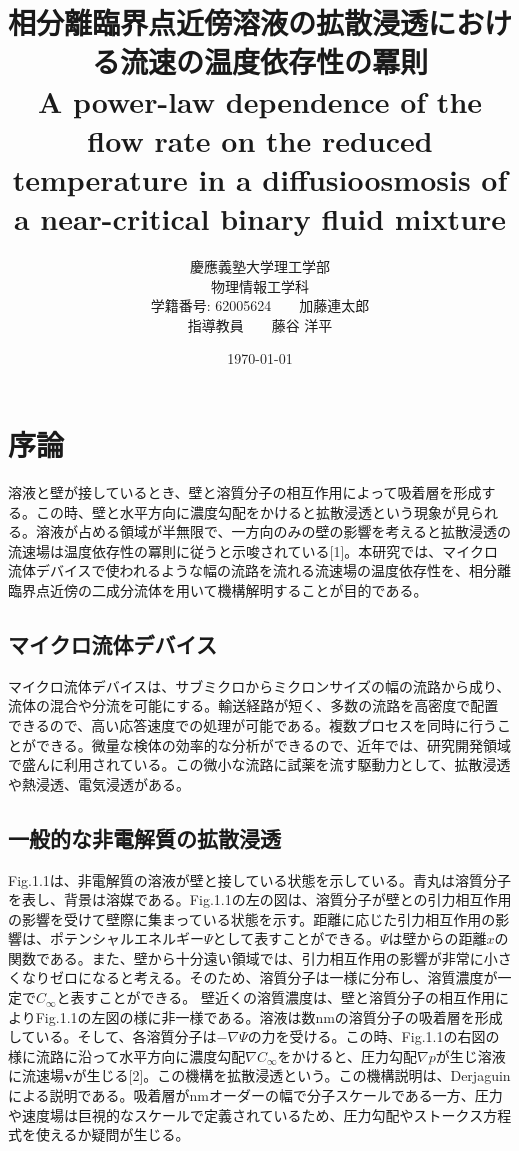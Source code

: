 \documentclass[a4paper,12pt, oneside, openany]{jsbook}
\title{相分離臨界点近傍溶液の拡散浸透における流速の温度依存性の冪則\\A power-law dependence of the flow rate on the reduced temperature in a diffusioosmosis of a near-critical binary fluid mixture }
\date{\today}
\author{慶應義塾大学理工学部\\
物理情報工学科\\
学籍番号: 62005624~~~~加藤連太郎\\
指導教員~~~~藤谷 洋平}
\begin{document}
\maketitle
\thispagestyle{empty}
\mbox{}\newpage
\newpage
\setcounter{tocdepth}{2}
\tableofcontents

\newpage
{}
\setcounter{page}{1}


\newpage
\chapter{序論}
溶液と壁が接しているとき、壁と溶質分子の相互作用によって吸着層を形成する。この時、壁と水平方向に濃度勾配をかけると拡散浸透という現象が見られる。溶液が占める領域が半無限で、一方向のみの壁の影響を考えると拡散浸透の流速場は温度依存性の冪則に従うと示唆されている[1]。本研究では、マイクロ流体デバイスで使われるような幅の流路を流れる流速場の温度依存性を、相分離臨界点近傍の二成分流体を用いて機構解明することが目的である。

\section{マイクロ流体デバイス}
マイクロ流体デバイスは、サブミクロからミクロンサイズの幅の流路から成り、流体の混合や分流を可能にする。輸送経路が短く、多数の流路を高密度で配置できるので、高い応答速度での処理が可能である。複数プロセスを同時に行うことができる。微量な検体の効率的な分析ができるので、近年では、研究開発領域で盛んに利用されている。この微小な流路に試薬を流す駆動力として、拡散浸透や熱浸透、電気浸透がある。




\section{一般的な非電解質の拡散浸透}
Fig.1.1は、非電解質の溶液が壁と接している状態を示している。青丸は溶質分子を表し、背景は溶媒である。Fig.1.1の左の図は、溶質分子が壁との引力相互作用の影響を受けて壁際に集まっている状態を示す。距離に応じた引力相互作用の影響は、ポテンシャルエネルギー$\Psi$として表すことができる。$\Psi$は壁からの距離$x$の関数である。また、壁から十分遠い領域では、引力相互作用の影響が非常に小さくなりゼロになると考える。そのため、溶質分子は一様に分布し、溶質濃度が一定で$C_\infty$と表すことができる。
壁近くの溶質濃度は、壁と溶質分子の相互作用によりFig.1.1の左図の様に非一様である。溶液は数nmの溶質分子の吸着層を形成している。そして、各溶質分子は$-\nabla\Psi$の力を受ける。この時、Fig.1.1の右図の様に流路に沿って水平方向に濃度勾配$\nabla C_\infty$をかけると、圧力勾配$\nabla p$が生じ溶液に流速場$\boldsymbol{v}$が生じる[2]。この機構を拡散浸透という。この機構説明は、Derjaguinによる説明である。吸着層が$\mathrm{nm}$オーダーの幅で分子スケールである一方、圧力や速度場は巨視的なスケールで定義されているため、圧力勾配やストークス方程式を使えるか疑問が生じる。
\end{document}
